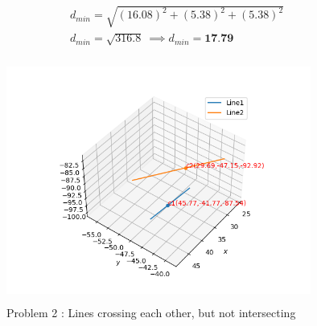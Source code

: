 \documentclass[journal,12pt,twocolumn]{IEEEtran}
\begin{document}
\begin{align}
    d_{min}=\sqrt{(16.08)^2+(5.38)^2+(5.38)^2}\\
    d_{min}=\sqrt{316.8} \ \implies d_{min}=\textbf{17.79} 
\end{align}
\begin{figure}[h!]
\centering
\includegraphics[width=10cm, height=8cm]{Figure_2}
\caption{Problem 2 : Lines crossing each other, but not intersecting}
\label{Fig4}
\end{figure}
\end{document}
